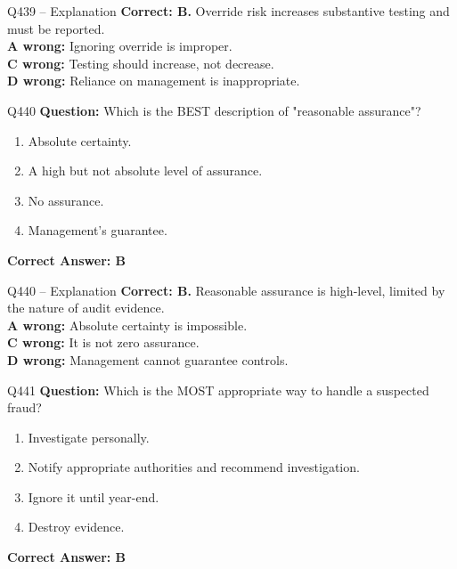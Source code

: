 \documentclass[aspectratio=169,10pt]{beamer}
\begin{document}
	\begin{frame}[t]{Q439 -- Explanation}
		\small
		\textbf{Correct: B.} Override risk increases substantive testing and must be reported. \\[4pt]
		\textbf{A wrong:} Ignoring override is improper. \\[2pt]
		\textbf{C wrong:} Testing should increase, not decrease. \\[2pt]
		\textbf{D wrong:} Reliance on management is inappropriate.
	\end{frame}
	
	\begin{frame}[t]{Q440}
		\small
		\textbf{Question:} Which is the BEST description of "reasonable assurance"?
		\begin{enumerate}[label=\Alph*.,itemsep=1pt,topsep=2pt]
			\item Absolute certainty.
			\item A high but not absolute level of assurance.
			\item No assurance.
			\item Management's guarantee.
		\end{enumerate}
		\vspace{4pt}
		\textbf{Correct Answer: B}
	\end{frame}
	
	\begin{frame}[t]{Q440 -- Explanation}
		\small
		\textbf{Correct: B.} Reasonable assurance is high-level, limited by the nature of audit evidence. \\[4pt]
		\textbf{A wrong:} Absolute certainty is impossible. \\[2pt]
		\textbf{C wrong:} It is not zero assurance. \\[2pt]
		\textbf{D wrong:} Management cannot guarantee controls.
	\end{frame}
	
	\begin{frame}[t]{Q441}
		\small
		\textbf{Question:} Which is the MOST appropriate way to handle a suspected fraud?
		\begin{enumerate}[label=\Alph*.,itemsep=1pt,topsep=2pt]
			\item Investigate personally.
			\item Notify appropriate authorities and recommend investigation.
			\item Ignore it until year-end.
			\item Destroy evidence.
		\end{enumerate}
		\vspace{4pt}
		\textbf{Correct Answer: B}
	\end{frame}
	
\end{document}
